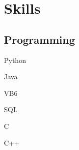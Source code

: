 \documentclass[]{abhijeet_viswa-deedy-resume-openfont}
\begin{document}
\begin{minipage}[t]{0.25\textwidth}
%


\section{Skills}
\subsection{Programming}
\begin{itemize*}
 \item Python
 \item Java
 \item VB6
\end{itemize*}
\subsectionsep

\begin{itemize*}
 \item SQL
 \item C
 \item C++
\end{itemize*}
\subsectionsep


\end{minipage}
\end{document}
